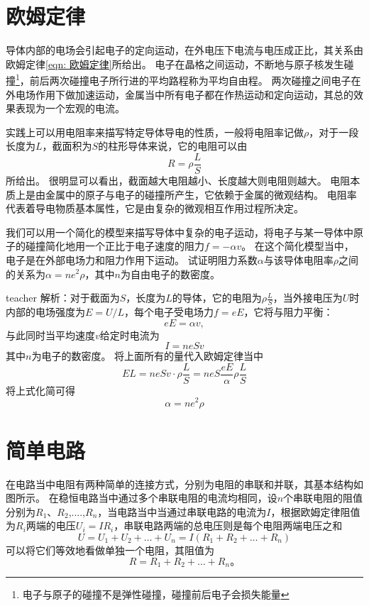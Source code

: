 \section{欧姆定律}
导体内部的电场会引起电子的定向运动，在外电压下电流与电压成正比，其关系由欧姆定律\ref{eqn: 欧姆定律}所给出。
电子在晶格之间运动，不断地与原子核发生碰撞\footnote{电子与原子的碰撞不是弹性碰撞，碰撞前后电子会损失能量}，前后两次碰撞电子所行进的平均路程称为{\heiti 平均自由程}。
两次碰撞之间电子在外电场作用下做加速运动，金属当中所有电子都在作热运动和定向运动，其总的效果表现为一个宏观的电流。


实践上可以用电阻率来描写特定导体导电的性质，一般将电阻率记做$\rho$，对于一段长度为$L$，截面积为$S$的柱形导体来说，它的电阻可以由
\begin{equation}
R=\rho\frac{L}{S}
\end{equation}
所给出。
很明显可以看出，截面越大电阻越小、长度越大则电阻则越大。
电阻本质上是由金属中的原子与电子的碰撞所产生，它依赖于金属的微观结构。
电阻率代表着导电物质基本属性，它是由复杂的微观相互作用过程所决定。


\begin{example}
我们可以用一个简化的模型来描写导体中复杂的电子运动，将电子与某一导体中原子的碰撞简化地用一个正比于电子速度的阻力$f=-\alpha v$。
在这个简化模型当中，电子是在外部电场力和阻力作用下运动。
试证明阻力系数$\alpha$与该导体电阻率$\rho$之间的关系为$\alpha = ne^2\rho$，其中$n$为自由电子的数密度。


\begin{taggedblock}{teacher}
\noindent
解析：对于截面为$S$，长度为$L$的导体，它的电阻为$\rho\frac{L}{S}$，当外接电压为$U$时内部的电场强度为$E=U/L$，每个电子受电场力$f=eE$，它将与阻力平衡：
\[eE=\alpha v,\]
与此同时当平均速度$v$给定时电流为
\[I=neSv\]
其中$n$为电子的数密度。
将上面所有的量代入欧姆定律当中
\[EL = neSv\cdot \rho\frac{L}{S}=neS\frac{eE}{\alpha}  \rho\frac{L}{S}\]
将上式化简可得
\[
\alpha = ne^2\rho
\]
\end{taggedblock}
\end{example}




\section{简单电路}
在电路当中电阻有两种简单的连接方式，分别为电阻的串联和并联，其基本结构如图所示。
在稳恒电路当中通过多个串联电阻的电流均相同，设$n$个串联电阻的阻值分别为$R_1$、$R_2$,....,$R_n$，当电路当中当通过串联电路的电流为$I$，根据欧姆定律阻值为$R_i$两端的电压$U_i = IR_i$，串联电路两端的总电压则是每个电阻两端电压之和
\[
U=U_1+U_2+\dots +U_n = I(R_1+R_2+\dots +R_n)
\]
可以将它们等效地看做单独一个电阻，其阻值为
\begin{equation}
R=R_1+R_2+\dots +R_n。
\end{equation}


